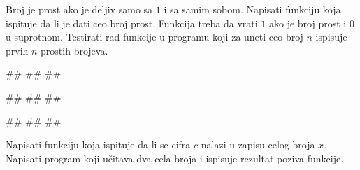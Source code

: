 \begin{Exercise}[label=v1.4_08] 
Broj je prost ako je deljiv samo sa $1$ i sa samim sobom. Napisati
funkciju  koja ispituje da li je dati ceo
broj prost. Funkcija treba da vrati $1$ ako je broj prost i $0$ u
suprotnom. Testirati rad funkcije u programu koji za uneti ceo broj
$n$ ispisuje prvih $n$ prostih brojeva.

\begin{miditest}
\begin{upotreba}{1}
#\naslovInt#
##
##
\end{upotreba}
\end{miditest}

\begin{miditest}
\begin{upotreba}{2}
#\naslovInt#
##
##
\end{upotreba}
\end{miditest}

\begin{miditest}
\begin{upotreba}{3}
#\naslovInt#
##
##
\end{upotreba}
\end{miditest}

\end{Exercise}
\begin{Answer}[ref=v1.4_08]
\end{Answer}

\begin{Exercise}[label=v1.4_09] 
Napisati funkciju  koja ispituje da li
se cifra $c$ nalazi u zapisu celog broja $x$. Napisati program koji
učitava dva cela broja i ispisuje rezultat poziva funkcije.

\end{Exercise}
\begin{Answer}[ref=v1.4_09]
\end{Answer}


